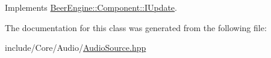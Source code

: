 Implements \mbox{\hyperlink{class_beer_engine_1_1_component_1_1_i_update_aeeda0aa303175720e449b4c51d9867dd}{Beer\+Engine\+::\+Component\+::\+I\+Update}}.



The documentation for this class was generated from the following file\+:\begin{DoxyCompactItemize}
\item 
include/\+Core/\+Audio/\mbox{\hyperlink{_audio_source_8hpp}{Audio\+Source.\+hpp}}\end{DoxyCompactItemize}
